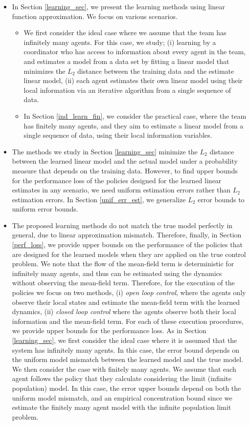 \documentclass[twoside,11pt]{article}
\begin{document}
\begin{itemize}
\item In Section \ref{learning_sec}, we present the learning methods using linear function approximation. We focus on various scenarios.
\begin{itemize}
\item We first consider the ideal case where we assume that the team has infinitely many agents. For this case, we study; (i) learning by a coordinator who has access to information about  every agent in the team, and estimates a model from a data set by fitting a linear model that minimizes the $L_2$ distance between the training data and the estimate linear model, (ii) each agent estimates their own linear model using their local information via an iterative algorithm from a single sequence of data.
\item In Section \ref{ind_learn_fin}, we consider the practical case, where the team has finitely many agents, and they aim to estimate a linear model from a single sequence of data, using their local information variables.
\end{itemize} 
\item The methods we study in Section \ref{learning_sec} minimize the $L_2$ distance between the learned linear model and the actual model under a probability measure that depends on the training data.   However, to find upper bounds for the performance loss of the policies designed for the learned linear estimates in any scenario, we need uniform estimation errors rather than  $L_2$ estimation errors.   In Section \ref{unif_err_est}, we generalize  $L_2$ error bounds to uniform error bounds.

\item The proposed learning methods do not match the true model perfectly in general, due to linear approximation mismatch. Therefore, finally, in Section \ref{perf_loss}, we provide upper bounds on the performance of the policies that are designed for the learned models when they are applied on the true control problem. We note that the flow of the mean-field term is deterministic for infinitely many agents, and thus can be estimated using the dynamics without observing the mean-field term.   Therefore, for the execution of the policies we focus on two methods, (i) {\it open loop control}, where the agents only observe their local states and estimate the mean-field term with the learned dynamics, (ii) {\it closed loop control} where the agents observe both their local information and the mean-field term. For each of these execution procedures, we provide upper bounds for the performance loss. As in Section \ref{learning_sec}, we first consider the ideal case where it is assumed that the system has infinitely many agents. In this case, the error bound depends on the uniform model mismatch between the learned model and the true model. We then consider the case with finitely many agents. We assume that each agent follows the policy that they calculate considering the limit (infinite population) model. In this case, the error upper bounds depend on both the uniform model mismatch, and an empirical concentration bound since we estimate the finitely many agent model with the infinite population limit problem.
\end{itemize}
\end{document}
